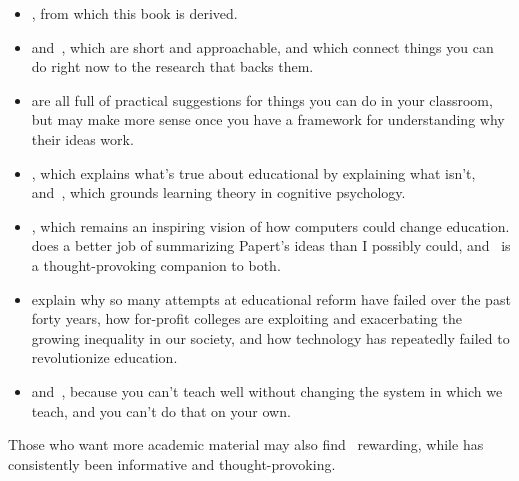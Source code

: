 \begin{itemize}

\item
  ,
  from which this book is derived.

\item
  \cite{Lang2016} and~\cite{Hust2012}, which are short and approachable,
  and which connect things you can do right now to the research that backs them.

\item
  \cite{Berg2012,Lemo2014,Majo2015,Broo2016,Rice2018,Wein2018b}
  are all full of practical suggestions for things you can do in your classroom,
  but may make more sense once you have a framework for understanding why their ideas work.

\item
  \cite{DeBr2015},
  which explains what's true about educational by explaining what isn't,
  and~\cite{Dida2016},
  which grounds learning theory in cognitive psychology.

\item
  \cite{Pape1993},
  which remains an inspiring vision of how computers could change education.
  does a better job of summarizing Papert's ideas than I possibly could,
  and~\cite{Craw2010} is a thought-provoking companion to both.

\item
  \cite{Gree2014,McMi2017,Watt2014} explain why so many attempts at educational reform have failed over the past forty years,
  how for-profit colleges are exploiting and exacerbating the growing inequality in our society,
  and how technology has repeatedly failed to revolutionize education.

\item
  \cite{Brow2007} and~\cite{Mann2015},
  because you can't teach well without changing the system in which we teach,
  and you can't do that on your own.

\end{itemize}

Those who want more academic material may also find~\cite{Guzd2015a,Hazz2014,Sent2018,Finc2019,Hpl2018} rewarding,
while  has consistently been informative and thought-provoking.

